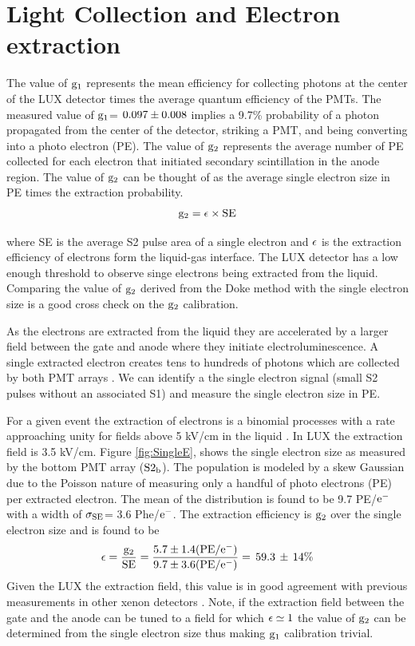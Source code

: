 \section{Light Collection and Electron extraction}

The value of $\rm g_1$ represents the mean efficiency for collecting photons at the center of the LUX detector times the average quantum efficiency of the PMTs. The measured value of $\rm g_1$= $\rm0.097\pm0.008$ implies a 9.7\% probability of a photon propagated from the center of the detector, striking a PMT, and being converting into a photo electron (PE). The value of $\rm g_2$ represents the average number of PE collected for each electron that initiated secondary scintillation in the anode region. The value of $\rm g_2$ can be thought of as the average single electron size in PE times the extraction probability.
\begin{equation}
\rm g_2=\epsilon \times SE
\end{equation}
 
 \noindent where SE is the average S2 pulse area of a single electron and $\rm \epsilon$ is the extraction efficiency of electrons form the liquid-gas interface. The LUX detector has a low enough threshold to observe singe electrons being extracted from the liquid. Comparing the value of $\rm g_2$ derived from the Doke method with the single electron size is a good cross check on the $\rm g_2$ calibration.
 
 As the electrons are extracted from the liquid they are accelerated by a larger field between the gate and anode where they initiate electroluminescence. A single extracted electron creates tens to hundreds of photons which are collected by both PMT arrays \cite{Mock}. We can identify a the single electron signal (small S2 pulses without an associated S1) and measure the single electron size in PE. 
 
 For a given event the extraction of electrons is a binomial processes with a rate approaching unity for fields above 5 kV/cm in the liquid \cite{Recomb_Time_Extraction} \cite{Aprile_LXe_overview}. In LUX the extraction field is 3.5 kV/cm. Figure \ref{fig:SingleE}, shows the single electron size as measured by the bottom PMT array ($\rm S2_b$). The population is modeled by a skew Gaussian due to the Poisson nature of measuring only a handful of photo electrons (PE) per extracted electron. The mean of the distribution is found to be 9.7 PE/$\rm e^-$ with a width of $\rm \sigma_{SE}$= 3.6 Phe/$\rm e^-$. The extraction efficiency is $\rm g_2$ over the single electron size and is found to be
\begin{equation}
\rm \epsilon =  \frac{g_2}{SE} = \frac{5.7 \pm 1.4 (PE/e^-)}{9.7 \pm 3.6 (PE/e^-)} = \, 59.3\, \pm \,14 \% 
\end{equation}
\noindent Given the LUX the extraction field, this value is in good agreement with previous measurements in other xenon detectors \cite{Recomb_Time_Extraction} \cite{Aprile_LXe_overview}. Note, if the extraction field between the gate and the anode can be tuned to a field for which $\rm \epsilon \simeq 1$ the value of $\rm g_2$ can be determined from the single electron size thus making $\rm g_1$ calibration trivial.

